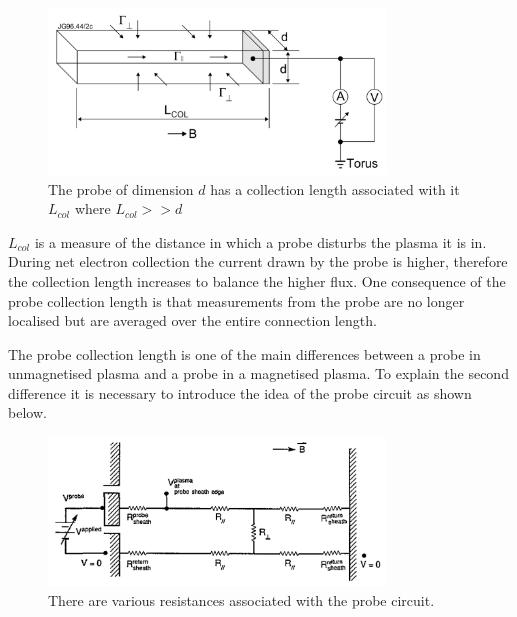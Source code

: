 \documentclass[12pt]{article}
\begin{document}
\begin{figure}[H]
\centering
\includegraphics[width=0.8\textwidth]{collectionlength}
\caption{The probe of dimension $d$ has a collection length associated with it $L_{col}$ where $L_{col}>>d$ \cite{bias-probes}}
\label{fig:shape}
\end{figure}

$L_{col}$ is a measure of the distance in which a probe disturbs the plasma it is in. During net electron collection the current drawn by the probe is higher, therefore the collection length increases to balance the higher flux. %
 One consequence of the probe collection length is that measurements from the probe are no longer localised but are averaged over the entire connection length.


The probe collection length is one of the main differences between a probe in unmagnetised plasma and a probe in a magnetised plasma. To explain the second difference it is necessary to introduce the idea of the probe circuit as shown below.
 
\begin{figure}[H]
\centering
\includegraphics[width=0.8\textwidth]{sheathcircuit}
\caption{There are various resistances associated with the probe circuit.\cite{te-determination}}
\label{circuit}
\end{figure}
\end{document}
